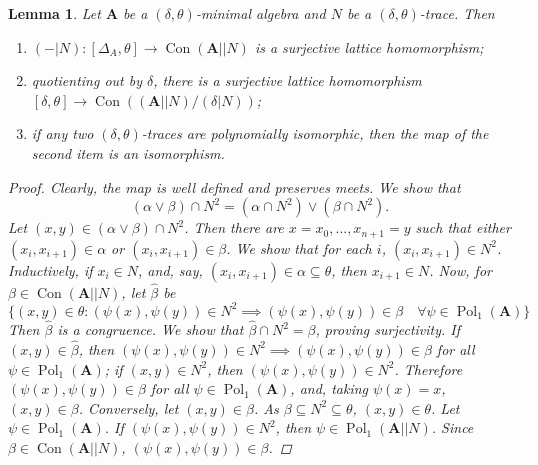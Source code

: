 \documentclass{amsart}
\theoremstyle{plain}
\newtheorem{lemma}[theorem]{Lemma}
\theoremstyle{definition}
\theoremstyle{remark}
\def\A{\forall}
\DeclareMathOperator{\Con}{Con}
\DeclareMathOperator{\Pol}{Pol}
\begin{document}
\begin{lemma}
    Let $\mathbf{A}$ be a $(\delta, \theta)$-minimal algebra and $N$ be a $(\delta, \theta)$-trace. 
    Then 
    \begin{enumerate}
        \item $(-|N): [\Delta_A, \theta] \to \Con(\mathbf{A}||N)$ is a surjective lattice homomorphism; 
        \item quotienting out by $\delta$, there is a surjective lattice homomorphism $[\delta, \theta] \to \Con((\mathbf{A}||N)/(\delta|N))$; 
        \item if any two $(\delta, \theta)$-traces are polynomially isomorphic, then the map of the second item is an isomorphism. 
    \end{enumerate}
    \begin{proof}
        Clearly, the map is well defined and preserves meets. 
        We show that 
        \begin{equation*}
            (\alpha \lor \beta) \cap N^2 = (\alpha \cap N^2) \lor (\beta \cap N^2) \text{.}
        \end{equation*}
        Let $(x,y) \in (\alpha \lor \beta) \cap N^2$. 
        Then there are $x=x_0, \ldots, x_{n+1}=y$ such that either $(x_i,x_{i+1}) \in \alpha$ or $(x_i,x_{i+1}) \in \beta$. 
        We show that for each $i$, $(x_i, x_{i+1}) \in N^2$. 
        Inductively, if $x_i \in N$, and, say, $(x_i, x_{i+1}) \in \alpha \subseteq \theta$, then $x_{i+1} \in N$. 
        Now, for $\beta \in \Con(\mathbf{A}||N)$, let $\hat{\beta}$ be
        \begin{equation*}
            \{(x,y) \in \theta : (\psi(x), \psi(y)) \in N^2 \implies (\psi(x), \psi(y)) \in \beta \quad \A \psi \in \Pol_1(\mathbf{A}) \}
        \end{equation*}
        Then $\hat{\beta}$ is a congruence. 
        We show that $\hat{\beta} \cap N^2 =\beta$, proving surjectivity. 
        If $(x,y) \in \hat{\beta}$, then $(\psi(x), \psi(y)) \in N^2 \implies (\psi(x), \psi(y)) \in \beta$ for all $\psi \in \Pol_1(\mathbf{A})$; 
        if $(x,y) \in N^2$, then $(\psi(x), \psi(y)) \in N^2$. 
        Therefore $(\psi(x), \psi(y)) \in \beta$ for all $\psi \in \Pol_1(\mathbf{A})$, and, taking $\psi(x)=x$, $(x,y) \in \beta$. 
        Conversely, let $(x,y) \in \beta$. As $\beta \subseteq N^2 \subseteq \theta$, $(x,y) \in \theta$. 
        Let $\psi \in \Pol_1(\mathbf{A})$. 
        If $(\psi(x), \psi(y)) \in N^2$, then $\psi \in \Pol_1(\mathbf{A}||N)$. 
        Since $\beta \in \Con(\mathbf{A}||N)$, $ (\psi(x), \psi(y)) \in \beta$.  


\end{proof}
\end{lemma}
\end{document}
